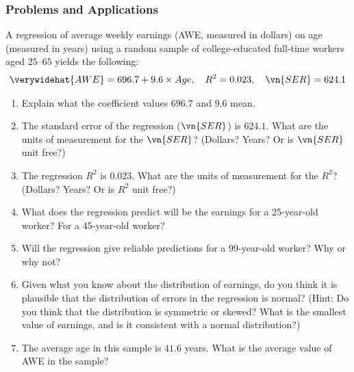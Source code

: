 

\begin{frame}
\frametitle{Problems and Applications}
A regression of average weekly earnings (AWE, measured in dollars) on age (measured in years) using a random sample of college-educated full-time workers aged $25$–$65$ yields the following:
\begin{align*}
\verywidehat{AWE} 
  = 696.7 + 9.6 \times Age,
  \quad R^2 = 0.023,
  \quad \vn{SER} = 624.1
\end{align*}
\begin{enumerate}
\item Explain what the coefficient values $696.7$ and $9.6$ mean.
\item The standard error of the regression ($\vn{SER}$) is $624.1$. What are the units of measurement for the $\vn{SER}$? (Dollars? Years? Or is $\vn{SER}$ unit free?)
\item The regression $R^2$ is $0.023$. What are the units of measurement for the $R^2$? (Dollars? Years? Or is $R^2$ unit free?)
\item What does the regression predict will be the earnings for a 25-year-old worker? For a 45-year-old worker?
\item Will the regression give reliable predictions for a 99-year-old worker? Why or why not?
\item Given what you know about the distribution of earnings, do you think it is plausible that the distribution of errors in the regression is normal? (Hint: Do you think that the distribution is symmetric or skewed? What is the smallest value of earnings, and is it consistent with a normal distribution?)
\item The average age in this sample is $41.6$ years. What is the average value of AWE in the sample?
\end{enumerate}
\end{frame}

